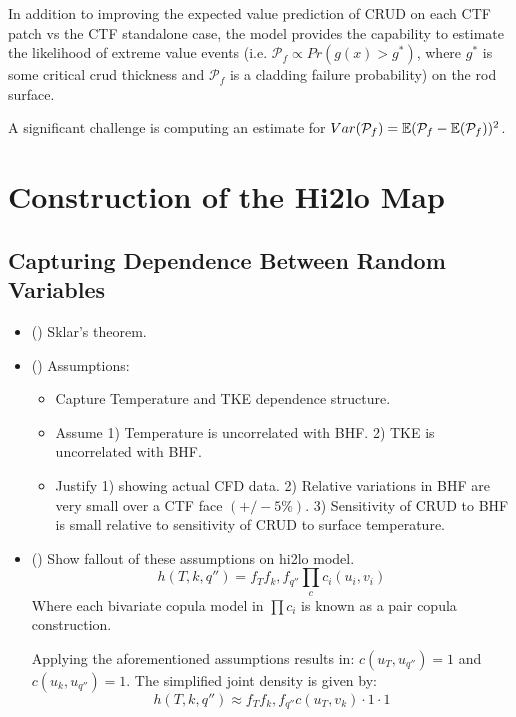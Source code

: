 In addition to improving the expected value prediction of CRUD on each CTF patch vs the CTF standalone case, the model provides the capability to estimate the likelihood of extreme value events (i.e. $\mathcal P_f \propto Pr(g(x) > g^*)$, where $g^*$ is some critical crud thickness and $\mathcal P_f$ is a cladding failure probability) on the rod surface.

A significant challenge is computing an estimate for $Var(\mathcal P_f) = \operatorname*{\mathbb{E}}(\mathcal P_f - \operatorname*{\mathbb{E}}(\mathcal P_f))^2$.


\section{Construction of the Hi2lo Map}

\subsection{Capturing Dependence Between Random Variables}
\begin{itemize}
        \item (\checkmark) Sklar's theorem.
        \item (\checkmark) Assumptions:
        \begin{itemize}
                \item Capture Temperature and TKE dependence structure.
                \item Assume 1) Temperature is uncorrelated with BHF.  2) TKE is uncorrelated with BHF.
                \item Justify 1) showing actual CFD data. 2) Relative variations in BHF are very small over a CTF face $(+/- 5\%)$.  3) Sensitivity of CRUD to BHF is small relative to sensitivity of CRUD to surface temperature.
        \end{itemize}
        \item (\checkmark) Show fallout of these assumptions on hi2lo model.
        \begin{equation}
                h(T, k, q'') = f_T f_k, f_{q''} \prod_c c_i(u_i, v_i)
        \end{equation}
        Where each bivariate copula model in $\prod c_i $ is known as a pair copula construction.

        Applying the aforementioned assumptions results in: $c(u_T, u_{q''}) = 1$ and $c(u_{k}, u_{q''}) = 1$. The simplified joint density is given by:
        \begin{equation}
                h(T, k, q'') \approx  f_T f_k, f_{q''} c(u_{T}, v_{k})  \cdot 1 \cdot 1
    \end{equation}
\end{itemize}


